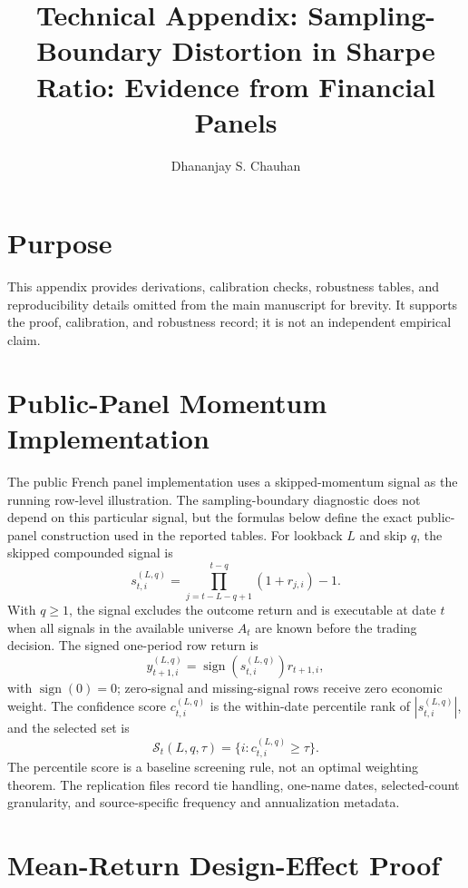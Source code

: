 \documentclass[12pt,a4paper]{article}
\title{Technical Appendix: Sampling-Boundary Distortion in Sharpe Ratio: Evidence from Financial Panels}
\author{}
\author{Dhananjay S. Chauhan}
\date{}
\DeclareMathOperator{\sign}{sign}
\begin{document}
\maketitle

\section{Purpose}

This appendix provides derivations, calibration checks, robustness
tables, and reproducibility details omitted from the main manuscript for
brevity.  It supports the proof, calibration, and robustness record; it
is not an independent empirical claim.

\section{Public-Panel Momentum Implementation}

The public French panel implementation uses a skipped-momentum signal as
the running row-level illustration.  The sampling-boundary diagnostic
does not depend on this particular signal, but the formulas below define
the exact public-panel construction used in the reported tables.
For lookback \(L\) and skip \(q\), the skipped compounded signal is
\begin{equation}
  s_{t,i}^{(L,q)} =
  \prod_{j=t-L-q+1}^{t-q} (1+r_{j,i}) - 1 .
  \label{eq:appendix-signal}
\end{equation}
With \(q\ge1\), the signal excludes the outcome return and is executable
at date \(t\) when all signals in the available universe \(A_t\) are
known before the trading decision.  The signed one-period row return is
\begin{equation}
  y_{t+1,i}^{(L,q)}=\sign(s_{t,i}^{(L,q)})r_{t+1,i},
\end{equation}
with \(\sign(0)=0\); zero-signal and missing-signal rows receive zero
economic weight.  The confidence score \(c_{t,i}^{(L,q)}\) is the
within-date percentile rank of \(|s_{t,i}^{(L,q)}|\), and the selected
set is
\[
  \mathcal S_t(L,q,\tau)=\{i:c_{t,i}^{(L,q)}\ge\tau\}.
\]
The percentile score is a baseline screening rule, not an optimal
weighting theorem.  The replication files record tie handling, one-name
dates, selected-count granularity, and source-specific frequency and
annualization metadata.

\section{Mean-Return Design-Effect Proof}
\end{document}
